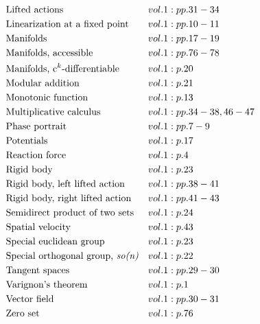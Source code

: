 \documentclass[a4paper]{article}
\begin{document}
\begin{align*}
&\text{Lifted actions}&& vol. 1: pp. 31-34\\
&\text{Linearization at a fixed point}&& vol. 1: pp. 10-11\\
&\text{Manifolds}&& vol. 1: pp. 17-19\\
&\text{Manifolds, accessible}&& vol. 1: pp. 76-78\\
&\text{Manifolds, c$^k$-differentiable}&& vol. 1: p. 20\\
&\text{Modular addition}&& vol. 1: p. 21\\
&\text{Monotonic function}&& vol. 1: p. 13\\
&\text{Multiplicative calculus}&& vol. 1: pp. 34-38, 46-47\\
&\text{Phase portrait}&& vol. 1: pp. 7-9\\
&\text{Potentials}&& vol. 1: p. 17\\
&\text{Reaction force}&& vol. 1: p. 4\\
&\text{Rigid body}&& vol. 1: p. 23\\
&\text{Rigid body, left lifted action}&& vol. 1: pp. 38-41\\
&\text{Rigid body, right lifted action}&& vol. 1: pp. 41-43\\
&\text{Semidirect product of two sets}&& vol. 1: p. 24\\
&\text{Spatial velocity}&& vol. 1: p. 43\\
&\text{Special euclidean group}&& vol. 1: p. 23\\
&\text{Special orthogonal group, \emph{so(n)}}&& vol. 1: p. 22\\
&\text{Tangent spaces}&& vol. 1: pp. 29-30\\
&\text{Varignon's theorem}&& vol. 1: p. 1\\
&\text{Vector field}&& vol. 1: pp. 30-31\\
&\text{Zero set}&& vol. 1: p. 76\\
\end{align*} 
\end{document}
